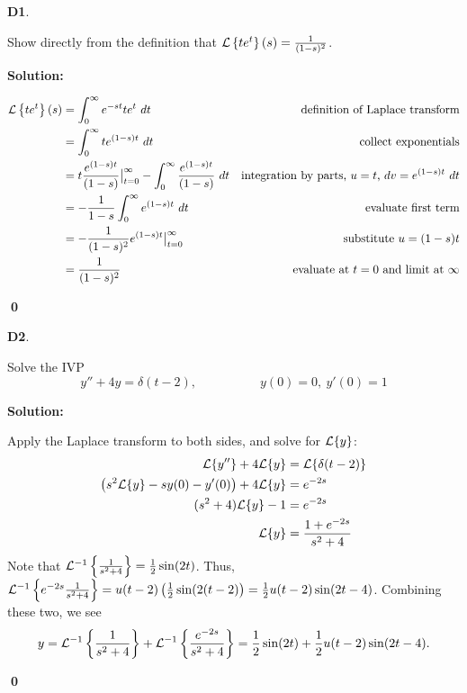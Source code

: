 \documentclass{article}
\newenvironment{problem}[1]
{
  \begin{flushleft}
  \textbf{#1}.
  \ignorespaces
}
{
  \end{flushleft}
}
\newenvironment{solution}
{
  \ignorespaces
  \textbf{Solution:}
}
{
  \ignorespacesafterend
  \begin{flushright}
  {\bfseries \qed}
  \end{flushright}
}
\begin{document}
\begin{problem}{D1}
Show directly from the definition that \(\mathcal{L}\left\{te^t\right\}(s) = \frac{1}{(1-s)^2}\).
\end{problem}
\begin{solution}
\begin{align*}
\mathcal{L}\left\{te^t\right\}(s) &= \int _0 ^\infty e^{-st} te^t \ dt & \text{definition of Laplace transform}\\
&=\int _0 ^\infty t e^{(1-s)t}\ dt  & \text{collect exponentials} \\
&= t\frac{e^{(1-s)t}}{(1-s)} \big |_{t=0} ^{\infty} - \int _0 ^\infty \frac{e^{(1-s)t}}{(1-s)}\ dt  & \text{integration by parts, \(u=t\), \(dv= e^{(1-s)t}\ dt\)}\\
&= -\frac{1}{1-s} \int _0 ^\infty e^{(1-s)t}\ dt & \text{evaluate first term}\\
&= -\frac{1}{(1-s)^2} e^{(1-s)t} \big|_{t=0} ^{\infty}  & \text{substitute \(u=(1-s)t\)}\\
&= \frac{1}{(1-s)^2} &\text{evaluate at \(t=0\) and limit at \(\infty\)}
\end{align*}
\end{solution}

\begin{problem}{D2}
Solve the IVP
\[y''+4y=\delta(t-2), \hspace{5em} y(0)=0,\ y'(0)=1\]
\end{problem}
\begin{solution}
Apply the Laplace transform to both sides, and solve for \(\mathcal{L}\{y\}\):
\begin{align*}
\mathcal{L}\{y''\}+4\mathcal{L}\{y\} &= \mathcal{L}\{\delta(t-2)\} \\
\left( s^2\mathcal{L}\{y\}-sy(0)-y'(0) \right) + 4 \mathcal{L}\{y\} &= e^{-2s} \\
(s^2+4)\mathcal{L}\{y\} -1 &= e^{-2s} \\
\mathcal{L}\{y\}&= \frac{1+e^{-2s}}{s^2+4}
\end{align*}
Note that \(\mathcal{L}^{-1}\left\{\frac{1}{s^2+4}\right\} = \frac{1}{2} \sin(2t)\).  Thus, \(\mathcal{L}^{-1}\left\{e^{-2s} \frac{1}{s^2+4}\right\} = u(t-2) \left(\frac{1}{2} \sin(2(t-2)\right) = \frac{1}{2} u(t-2) \sin(2t-4)\).  Combining these two, we see
\[y = \mathcal{L}^{-1} \left\{\frac{1}{s^2+4}\right\}+\mathcal{L}^{-1}\left\{\frac{e^{-2s}}{s^2+4}\right\} = \frac{1}{2}\sin(2t)+\frac{1}{2} u(t-2)\sin(2t-4).\]
\end{solution}
\end{document}
